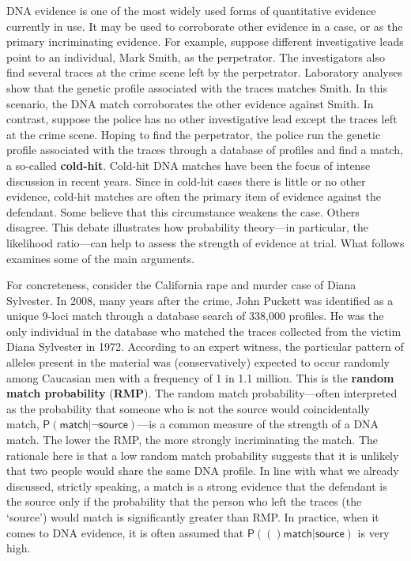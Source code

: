 \documentclass[
  10pt,
  dvipsnames,enabledeprecatedfontcommands]{scrartcl}
\newcommand{\pr}[1]{\mathsf{P}(#1)}
\begin{document}
DNA evidence is one of the most widely used forms of quantitative
evidence currently in use. It may be used to corroborate other evidence
in a case, or as the primary incriminating evidence. For example,
suppose different investigative leads point to an individual, Mark
Smith, as the perpetrator. The investigators also find several traces at
the crime scene left by the perpetrator. Laboratory analyses show that
the genetic profile associated with the traces matches Smith. In this
scenario, the DNA match corroborates the other evidence against Smith.
In contrast, suppose the police has no other investigative lead except
the traces left at the crime scene. Hoping to find the perpetrator, the
police run the genetic profile associated with the traces through a
database of profiles and find a match, a so-called \textbf{cold-hit}.
Cold-hit DNA matches have been the focus of intense discussion in recent
years. Since in cold-hit cases there is little or no other evidence,
cold-hit matches are often the primary item of evidence against the
defendant. Some believe that this circumstance weakens the case. Others
disagree. This debate illustrates how probability theory---in
particular, the likelihood ratio---can help to assess the strength of
evidence at trial. What follows examines some of the main arguments.

For concreteness, consider the California rape and murder case of Diana
Sylvester. In 2008, many years after the crime, John Puckett was
identified as a unique 9-loci match through a database search of 338,000
profiles. He was the only individual in the database who matched the
traces collected from the victim Diana Sylvester in 1972. According to
an expert witness, the particular pattern of alleles present in the
material was (conservatively) expected to occur randomly among Caucasian
men with a frequency of 1 in 1.1 million. This is the
\textbf{random match probability} (\textbf{RMP}). The random match
probability---often interpreted as the probability that someone who is
not the source would coincidentally match,
\(\pr{\textsf{match} \vert \neg \textsf{source}}\)---is a common measure
of the strength of a DNA match. The lower the RMP, the more strongly
incriminating the match. The rationale here is that a low random match
probability suggests that it is unlikely that two people would share the
same DNA profile. In line with what we already discussed, strictly
speaking, a match is a strong evidence that the defendant is the source
only if the probability that the person who left the traces (the
`source') would match is significantly greater than RMP. In practice,
when it comes to DNA evidence, it is often assumed that
\(\pr(\textsf{match} \vert \textsf{source})\) is very high.
\end{document}
